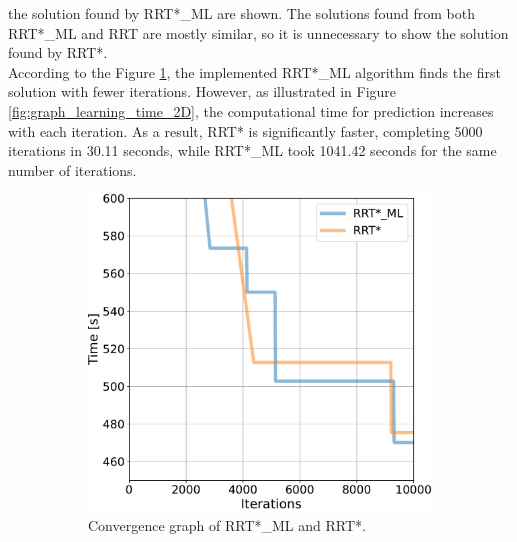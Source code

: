 \documentclass{ctuthesis}
\begin{document}
the solution found by RRT*\_ML are shown.  
The solutions found from both RRT*\_ML and RRT are mostly similar, 
so it is unnecessary to show the solution found by RRT*.  
\\[12pt]
According to the Figure \ref{fig:graph_E_2D}, 
the implemented RRT*\_ML algorithm finds the first solution with fewer iterations. 
However, as illustrated in Figure \ref{fig:graph_learning_time_2D},
the computational time for prediction increases with each iteration. 
As a result, RRT* is significantly faster, 
completing 5000 iterations in 30.11 seconds, while RRT*\_ML took 1041.42 seconds 
for the same number of iterations.
\begin{figure}[!ht]
  \centering 
  \begin{subfigure}[t]{0.49\textwidth}
    \includegraphics[width=\textwidth]{figChap5/graph_E_2D.pdf}  
    \caption{Convergence graph of RRT*\_ML and RRT*.}
    \label{fig:graph_E_2D}
  \end{subfigure}
  \begin{subfigure}[t]{0.49\textwidth}

\end{subfigure}
\end{figure}
\end{document}
